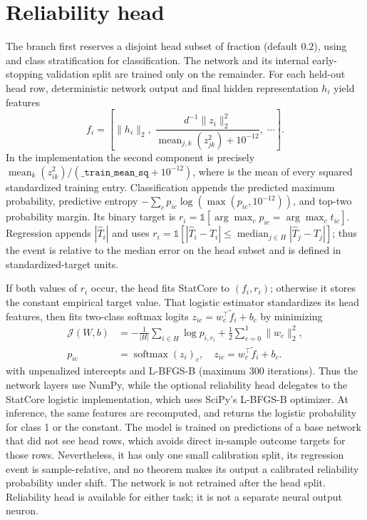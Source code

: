 \documentclass[conference]{IEEEtran}
\begin{document}
\section{Reliability head}
The  branch first reserves a disjoint head subset of fraction  (default $0.2$), using  and class stratification for classification. The network and its internal early-stopping validation split are trained only on the remainder. For each held-out head row, deterministic network output and final hidden representation $h_i$ yield features
\begin{equation}
 f_i=\left[\|h_i\|_2,\;\frac{d^{-1}\|z_i\|_2^2}{\operatorname{mean}_{j,k}(z_{jk}^2)+10^{-12}},\;\cdots\right].
 \label{eq:relfeatures}
\end{equation}
In the implementation the second component is precisely $\operatorname{mean}_k(z_{ik}^2)/(\texttt{\_train\_mean\_sq}+10^{-12})$, where  is the mean of every squared standardized training entry. Classification appends the predicted maximum probability, predictive entropy $-\sum_cp_{ic}\log(\max(p_{ic},10^{-12}))$, and top-two probability margin. Its binary target is $r_i=\mathbb1[\arg\max_c p_{ic}=\arg\max_c t_{ic}]$. Regression appends $|\hat T_i|$ and uses $r_i=\mathbb1[|\hat T_i-T_i|\leq\operatorname{median}_{j\in H}|\hat T_j-T_j|]$; thus the event is relative to the median error on the head subset and is defined in standardized-target units.

If both values of $r_i$ occur, the head fits StatCore  to $(f_i,r_i)$; otherwise it stores the constant empirical target value. That logistic estimator standardizes its head features, then fits two-class softmax logits $z_{ic}=w_c^\top\tilde f_i+b_c$ by minimizing
\begin{align}
 \mathcal J(W,b)&=-\frac1{|H|}\sum_{i\in H}\log p_{i,r_i}
 +\frac12\sum_{c=0}^1\|w_c\|_2^2,\\
 p_{ic}&=\operatorname{softmax}(z_i)_c,\quad z_{ic}=w_c^\top\tilde f_i+b_c.
 \label{eq:headlogistic}
\end{align}
with unpenalized intercepts and L-BFGS-B (maximum 300 iterations). Thus the network layers use NumPy, while the optional reliability head delegates to the StatCore logistic implementation, which uses SciPy's L-BFGS-B optimizer. At inference, the same features are recomputed, and  returns the logistic probability for class 1 or the constant. The model is trained on predictions of a base network that did not see head rows, which avoids direct in-sample outcome targets for those rows. Nevertheless, it has only one small calibration split, its regression event is sample-relative, and no theorem makes its output a calibrated reliability probability under shift. The network is not retrained after the head split. Reliability head is available for either task; it is not a separate neural output neuron.
\end{document}
